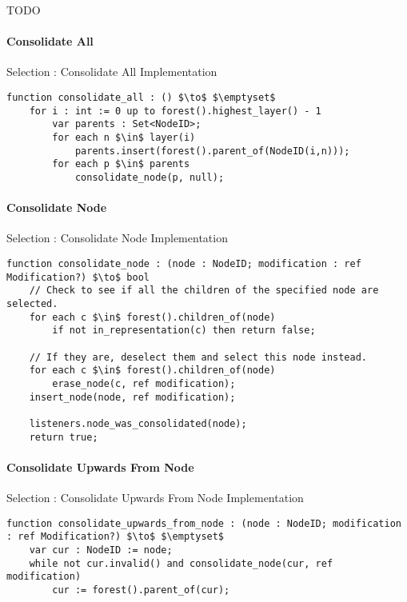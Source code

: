 TODO

\paragraph{Consolidate All}

\begin{stulisting}[H]
\caption{Selection : Consolidate All Implementation}
\begin{lstlisting}[style=Default]
function consolidate_all : () $\to$ $\emptyset$
	for i : int := 0 up to forest().highest_layer() - 1
		var parents : Set<NodeID>;
		for each n $\in$ layer(i)
			parents.insert(forest().parent_of(NodeID(i,n)));
		for each p $\in$ parents
			consolidate_node(p, null);
\end{lstlisting}
\end{stulisting}

\paragraph{Consolidate Node}

\begin{stulisting}[H]
\caption{Selection : Consolidate Node Implementation}
\begin{lstlisting}[style=Default]
function consolidate_node : (node : NodeID; modification : ref Modification?) $\to$ bool
	// Check to see if all the children of the specified node are selected.
	for each c $\in$ forest().children_of(node)
		if not in_representation(c) then return false;

	// If they are, deselect them and select this node instead.
	for each c $\in$ forest().children_of(node)
		erase_node(c, ref modification);
	insert_node(node, ref modification);

	listeners.node_was_consolidated(node);
	return true;
\end{lstlisting}
\end{stulisting}

\paragraph{Consolidate Upwards From Node}

\begin{stulisting}[H]
\caption{Selection : Consolidate Upwards From Node Implementation}
\begin{lstlisting}[style=Default]
function consolidate_upwards_from_node : (node : NodeID; modification : ref Modification?) $\to$ $\emptyset$
	var cur : NodeID := node;
	while not cur.invalid() and consolidate_node(cur, ref modification)
		cur := forest().parent_of(cur);
\end{lstlisting}
\end{stulisting}

